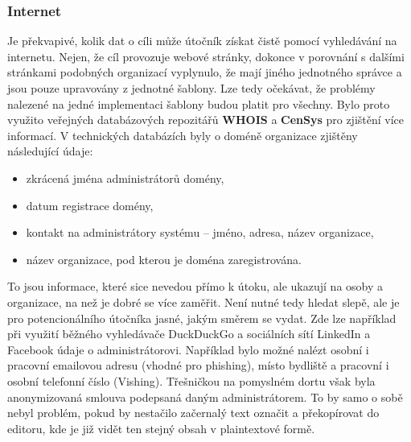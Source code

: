 \subsubsection{Internet}
Je překvapivé, kolik dat o cíli může útočník získat čistě pomocí vyhledávání na internetu.
Nejen, že cíl provozuje webové stránky, dokonce v porovnání s dalšími stránkami podobných organizací vyplynulo, že mají jiného jednotného správce a jsou pouze upravovány z jednotné šablony.
Lze tedy očekávat, že problémy nalezené na jedné implementaci šablony budou platit pro všechny.
Bylo proto využito veřejných databázových repozitářů \textbf{WHOIS} a \textbf{CenSys} pro zjištění více informací.
V technických databázích byly o doméně organizace zjištěny následující údaje:
\begin{itemize}
	\item zkrácená jména administrátorů domény,
	\item datum registrace domény,
	\item kontakt na administrátory systému – jméno, adresa, název organizace,
	\item název organizace, pod kterou je doména zaregistrována.
\end{itemize}

To jsou informace, které sice nevedou přímo k útoku, ale ukazují na osoby a organizace, na než je dobré se více zaměřit.
Není nutné tedy hledat slepě, ale je pro potencionálního útočníka jasné, jakým směrem se vydat.
Zde lze například při využití běžného vyhledávače DuckDuckGo a sociálních sítí LinkedIn a Facebook údaje o administrátorovi.
Například bylo možné nalézt osobní i pracovní emailovou adresu (vhodné pro phishing), místo bydliště a pracovní i osobní telefonní číslo (Vishing).
Třešničkou na pomyslném dortu však byla anonymizovaná smlouva podepsaná daným administrátorem.
To by samo o sobě nebyl problém, pokud by nestačilo začernalý text označit a překopírovat do editoru, kde je již vidět ten stejný obsah v plaintextové formě.

